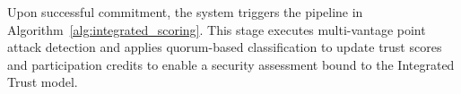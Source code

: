 \documentclass[conference]{IEEEtran}
\newcommand{\rj}[1]{{\color{blue}#1}}
\newcommand{\md}[1]{{\color{purple}#1}}
\begin{document}
\md{Upon successful commitment, the system triggers the pipeline in Algorithm~\ref{alg:integrated_scoring}. This stage executes multi-vantage point attack detection and applies quorum-based classification to update trust scores and participation credits to enable a security assessment bound to the Integrated Trust model.}






\end{document}
